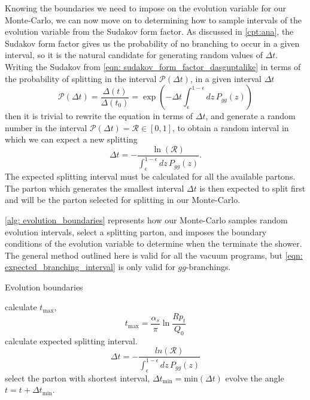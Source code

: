 \documentclass[main.tex]{subfiles}
\begin{document}
Knowing the boundaries we need to impose on the evolution variable for our Monte-Carlo, we can now move on to determining how to sample intervals of the evolution variable from the Sudakov form factor. As discussed in \autoref{cpt:ana}, the Sudakov form factor gives us the probability of no branching to occur in a given interval, so it is the natural candidate for generating random values of \(\Delta t\). Writing the Sudakov from \autoref{eqn: sudakov_form_factor_dasguptalike} in terms of the probability of splitting in the interval \(\mathcal{P}(\Delta t)\), in a given interval \(\Delta t\) 
\begin{equation}\label{eqn: branching_probability_from_sudakov_gg}
    \mathcal{P}(\Delta t) = \frac{\Delta(t)}{\Delta(t_0)} = \exp\left(-\Delta t \int_\epsilon^{1-\epsilon}dz \, P_{gg}(z)\right) 
\end{equation}
then it is trivial to rewrite the equation in terms of \(\Delta t\), and generate a random number in the interval \(\mathcal{P}(\Delta t) = \mathcal{R} \in [0,1]\), to obtain a random interval in which we can expect a new splitting
\begin{equation}\label{eqn: expected_branching_interval}
    \Delta t = -\frac{\ln(\mathcal{R})}{ \int_\epsilon^{1-\epsilon}dz \, P_{gg}(z)}.
\end{equation}
The expected splitting interval must be calculated for all the available partons. The parton which generates the smallest interval \(\Delta t\) is then expected to split first and will be the parton selected for splitting in our Monte-Carlo. 

\autoref{alg: evolution_boundaries} represents how our Monte-Carlo samples random evolution intervals, select a splitting parton, and imposes the boundary conditions of the evolution variable to determine when the terminate the shower. The general method outlined here is valid for all the vacuum programs, but \autoref{eqn: expected_branching_interval} is only valid for \(gg\)-branchings.
\begin{center}
\begin{minipage}{.8\linewidth}
\begin{algorithm}[H]
\caption{Evolution boundaries}
\label{alg: evolution_boundaries}
\begin{algorithmic}[1]
    \State calculate \(t_{\text{max}}\),
         \[t_{\text{max}} = \frac{\alpha_s}{\pi} \ln \frac{Rp_t}{Q_0}\]
        \State calculate expected splitting interval. \[\Delta t = -\frac{ln(\mathcal{R})}{ \int_\epsilon^{1-\epsilon}dz \, P_{gg}(z)}\]
        \EndFor
    \State select the parton with shortest interval, \(\Delta t_{\text{min}} = \text{min}(\Delta t)\)
    \State evolve the angle \(t = t + \Delta t_{\text{min}}\).
    \EndWhile
\end{algorithmic}
\end{algorithm}
\end{minipage}
\end{center}
\end{document}
